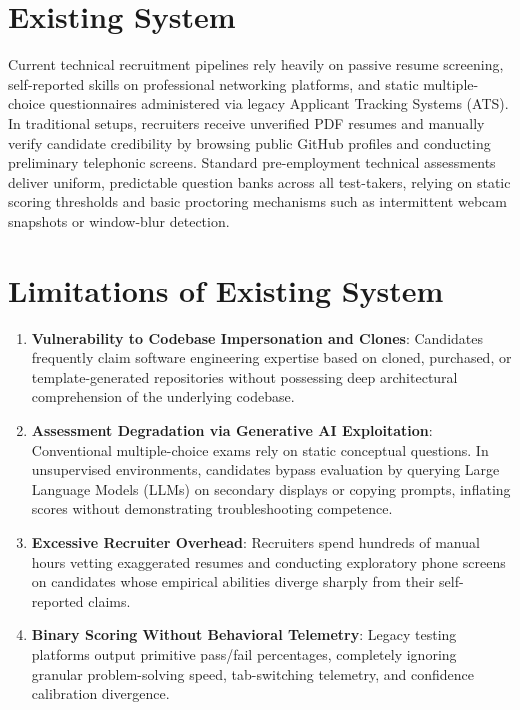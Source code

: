 \section{Existing System}
Current technical recruitment pipelines rely heavily on passive resume screening, self-reported skills on professional networking platforms, and static multiple-choice questionnaires administered via legacy Applicant Tracking Systems (ATS). In traditional setups, recruiters receive unverified PDF resumes and manually verify candidate credibility by browsing public GitHub profiles and conducting preliminary telephonic screens. Standard pre-employment technical assessments deliver uniform, predictable question banks across all test-takers, relying on static scoring thresholds and basic proctoring mechanisms such as intermittent webcam snapshots or window-blur detection.

\section{Limitations of Existing System}
\begin{enumerate}
    \item \textbf{Vulnerability to Codebase Impersonation and Clones}: Candidates frequently claim software engineering expertise based on cloned, purchased, or template-generated repositories without possessing deep architectural comprehension of the underlying codebase.
    \item \textbf{Assessment Degradation via Generative AI Exploitation}: Conventional multiple-choice exams rely on static conceptual questions. In unsupervised environments, candidates bypass evaluation by querying Large Language Models (LLMs) on secondary displays or copying prompts, inflating scores without demonstrating troubleshooting competence.
    \item \textbf{Excessive Recruiter Overhead}: Recruiters spend hundreds of manual hours vetting exaggerated resumes and conducting exploratory phone screens on candidates whose empirical abilities diverge sharply from their self-reported claims.
    \item \textbf{Binary Scoring Without Behavioral Telemetry}: Legacy testing platforms output primitive pass/fail percentages, completely ignoring granular problem-solving speed, tab-switching telemetry, and confidence calibration divergence.
\end{enumerate}

